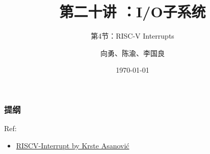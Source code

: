 


\title[第20讲]{第二十讲 ：I/O子系统} %
\subtitle{第4节：RISC-V Interrupts}
\author{向勇、陈渝、李国良} %
\date{\today} %



\begin{frame}
\titlepage %
\end{frame}

\begin{frame}
\frametitle{提纲} %
\tableofcontents %

Ref:
    \begin{itemize}
        \item \href{https://riscv.org/wp-content/uploads/2016/07/Tue0900_RISCV-20160712-InterruptsV2.pdf}{RISCV-Interrupt  by Krste Asanović}
    \end{itemize}

\end{frame}
